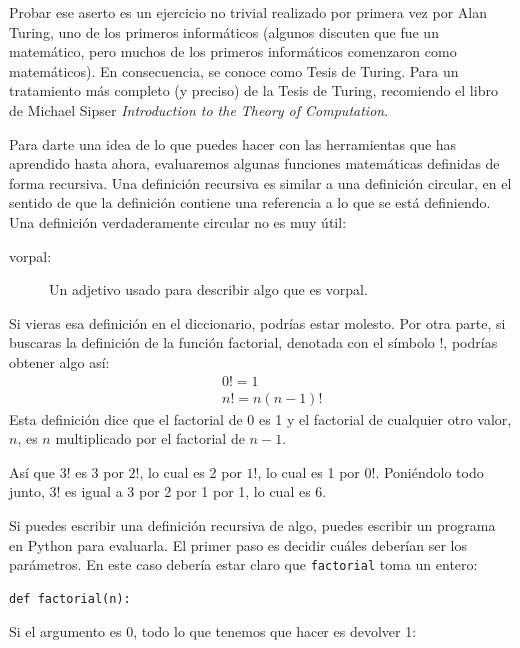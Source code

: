 \documentclass[10pt]{book}
\begin{document}
Probar ese aserto es un ejercicio no trivial realizado por primera vez por Alan
Turing, uno de los primeros informáticos (algunos discuten que
fue un matemático, pero muchos de los primeros informáticos comenzaron como
matemáticos).  En consecuencia, se conoce como Tesis de Turing.
Para un tratamiento más completo (y preciso) de la Tesis de Turing,
recomiendo el libro de Michael Sipser {\em Introduction to the
Theory of Computation}.

Para darte una idea de lo que puedes hacer con las herramientas que has aprendido
hasta ahora, evaluaremos algunas funciones matemáticas definidas de forma
recursiva.  Una definición recursiva es similar a una definición
circular, en el sentido de que la definición contiene una referencia a lo que
se está definiendo.  Una definición verdaderamente circular no es muy
útil:

\begin{description}

\item[vorpal:] Un adjetivo usado para describir algo que es vorpal.

\end{description}

Si vieras esa definición en el diccionario, podrías estar molesto. Por
otra parte, si buscaras la definición de la función
factorial, denotada con el símbolo $!$, podrías obtener algo
así:
%
\begin{eqnarray*}
&&  0! = 1 \\
&&  n! = n (n-1)!
\end{eqnarray*}
%
Esta definición dice que el factorial de 0 es 1 y el factorial de
cualquier otro valor, $n$, es $n$ multiplicado por el factorial de $n-1$.

Así que $3!$ es 3 por $2!$, lo cual es 2 por $1!$, lo cual es 1 por
$0!$. Poniéndolo todo junto, $3!$ es igual a 3 por 2 por 1 por 1,
lo cual es 6.

Si puedes escribir una definición recursiva de algo, puedes
escribir un programa en Python para evaluarla.  El primer paso es decidir
cuáles deberían ser los parámetros.  En este caso debería estar claro
que {\tt factorial} toma un entero:

\begin{verbatim}
def factorial(n):
\end{verbatim}
%
Si el argumento es 0, todo lo que tenemos que hacer es devolver 1:
\end{document}
